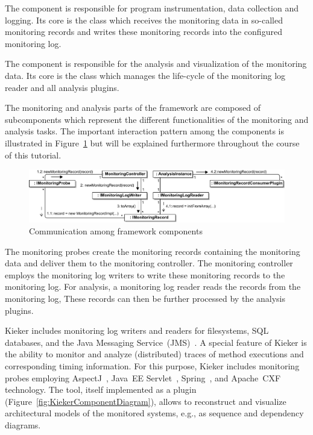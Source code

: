 \noindent The \KiekerMonitoringPart{} component is responsible for program instrumentation, data collection and logging. Its core is the class  which receives the monitoring data in so-called monitoring records and writes these monitoring records into the configured monitoring log. 

The component \KiekerAnalysisPart{} is responsible for the analysis and visualization of the monitoring data. Its core is the class  which manages the life-cycle of the monitoring log reader and all analysis plugins.

The monitoring and analysis parts of the \Kieker{} framework are composed of subcomponents which represent the different functionalities of the monitoring and analysis tasks. The important interaction pattern among the components is illustrated in Figure~\ref{fig:KiekerCommunicationDiagram} but will be explained furthermore throughout the course of this tutorial. 

\begin{figure}[H]\centering
\includegraphics[width=1\textwidth]{images/kiekerCommunications-revisedReArranged-woMonitoringLog-bw-newNames}
\caption{Communication among \Kieker{} framework components}
\label{fig:KiekerCommunicationDiagram}
\end{figure}
		
\noindent The monitoring probes create the monitoring records containing the %
monitoring data and deliver them to the monitoring controller. %
The monitoring controller employs the monitoring log writers to write these %
monitoring records to the monitoring log. %
For analysis, a monitoring log reader reads the records from the monitoring log, %
These records can then be further processed by the analysis plugins.


Kieker includes monitoring log writers and readers for filesystems, SQL %
databases, and the Java Messaging Service~(JMS)~\cite{JMS-WebSite}. %
A special feature of Kieker is the ability to monitor and analyze (distributed) %
traces of method executions and corresponding timing information. %
For this purpose, Kieker includes monitoring probes employing %
AspectJ~\cite{AspectJ-WebSite}, %
Java~EE Servlet~\cite{JavaServletTechnology-WebSite}, %
Spring~\cite{Spring-WebSite}, and %
Apache~CXF~\cite{CXF-WebSite} technology. %
The \KiekerTraceAnalysis{} tool, itself implemented as a \KiekerAnalysisPart{} %
plugin (Figure~\ref{fig:KiekerComponentDiagram}), allows to reconstruct and visualize architectural models of the monitored %
systems, e.g., as sequence and dependency diagrams.

